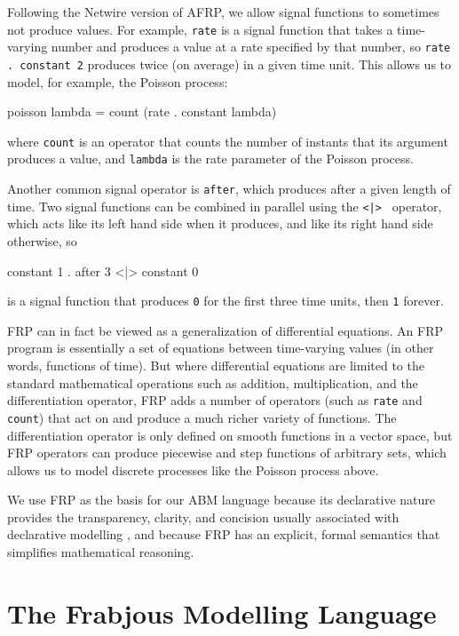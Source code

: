 \documentclass{article}
\begin{document}
  Following the Netwire version of AFRP\cite{netwire}, we allow signal functions to sometimes not produce values. For example, \lstinline{rate} is a signal function that takes a time-varying number and produces a value at a rate specified by that number, so \lstinline{rate . constant 2} produces twice (on average) in a given time unit. This allows us to model, for example, the Poisson process: 
\begin{code}
poisson lambda = count (rate . constant lambda)
\end{code}
where \lstinline{count} is an operator that counts the number of instants that its argument produces a value, and \lstinline{lambda} is the rate parameter of the Poisson process. 

  Another common signal operator is \lstinline{after}, which produces after a given length of time. Two signal functions can be combined in parallel using the \lstinline{<|> } operator, which acts like its left hand side when it produces, and like its right hand side otherwise, so 
\begin{code}
constant 1 . after 3 <|> constant 0
\end{code}
is a signal function that produces \lstinline{0} for the first three time units, then \lstinline{1} forever. 
  
    FRP can in fact be viewed as a generalization of differential equations.  An FRP program is essentially a set of equations between time-varying values (in other words, functions of time). But where differential equations are limited to the standard mathematical operations such as addition, multiplication, and the differentiation operator, FRP adds a number of operators (such as \lstinline{rate} and \lstinline{count}) that act on and produce a much richer variety of functions. The differentiation operator is only defined on smooth functions in a vector space, but FRP operators can produce piecewise and step functions of arbitrary sets, which allows us to model discrete processes like the Poisson process above. 
  
  We use FRP as the basis for our ABM language because its declarative nature provides the transparency, clarity, and concision usually associated with declarative modelling \cite{system_dyn_approaches, system_dyn_tradeoffs}, and because FRP has an explicit, formal semantics \cite{fran} that simplifies mathematical reasoning.



\section{The Frabjous Modelling Language}
\end{document}
